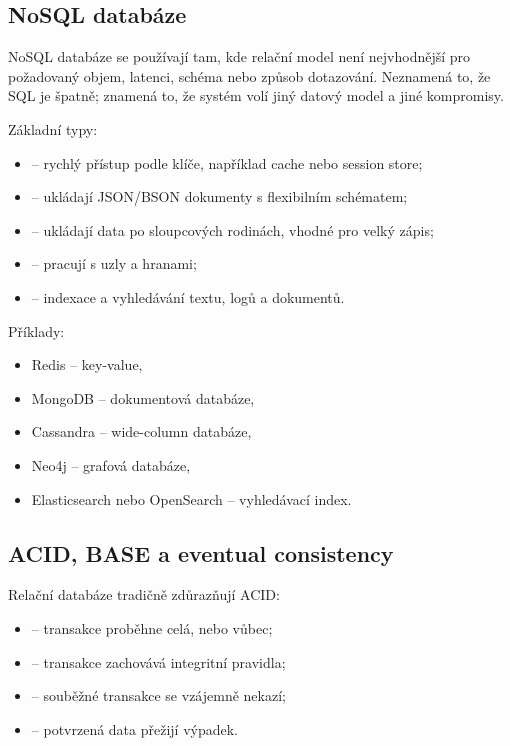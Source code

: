 \subsection{NoSQL databáze}

NoSQL databáze se používají tam, kde relační model není nejvhodnější pro požadovaný objem, latenci,
schéma nebo způsob dotazování. Neznamená to, že SQL je špatně; znamená to, že systém volí jiný datový model
a jiné kompromisy.

Základní typy:
\begin{itemize}
    \item {} -- rychlý přístup podle klíče, například cache nebo session store;
    \item {} -- ukládají JSON/BSON dokumenty s flexibilním schématem;
    \item {} -- ukládají data po sloupcových rodinách, vhodné pro velký zápis;
    \item {} -- pracují s uzly a hranami;
    \item {} -- indexace a vyhledávání textu, logů a dokumentů.
\end{itemize}

Příklady:
\begin{itemize}
    \item Redis -- key-value,
    \item MongoDB -- dokumentová databáze,
    \item Cassandra -- wide-column databáze,
    \item Neo4j -- grafová databáze,
    \item Elasticsearch nebo OpenSearch -- vyhledávací index.
\end{itemize}

\subsection{ACID, BASE a eventual consistency}

Relační databáze tradičně zdůrazňují ACID:
\begin{itemize}
    \item {} -- transakce proběhne celá, nebo vůbec;
    \item {} -- transakce zachovává integritní pravidla;
    \item {} -- souběžné transakce se vzájemně nekazí;
    \item {} -- potvrzená data přežijí výpadek.
\end{itemize}

